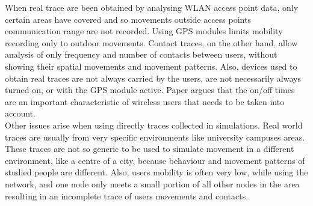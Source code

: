 When real trace are been obtained by analysing WLAN access point data, only certain areas have covered and so movements outside access points communication range are not recorded. Using GPS modules limits mobility recording only to outdoor movements. Contact traces, on the other hand, allow analysis of only frequency and number of contacts between users, without showing their spatial movements and movement patterns. Also, devices used to obtain real traces are not always carried by the users, are not necessarily always turned on, or with the GPS module active. Paper \cite{ImpactofHumanMobility} argues that the on/off times are an important characteristic of wireless users that needs to be taken into account.
\\

Other issues arise when using directly traces collected in simulations. Real world traces are usually from very specific environments like university campuses areas. These traces are not so generic to be used to simulate movement in a different environment, like a centre of a city, because behaviour and movement patterns of studied people are different. Also, users mobility is often very low, while using the network, and one node only meets a small portion of all other nodes in the area resulting in an incomplete trace of users movements and contacts.
\\


